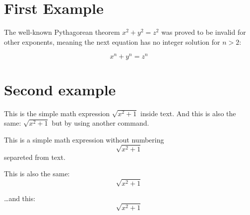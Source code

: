 \documentclass{article}
\begin{document}
\section{First Example}

The well-known Pythagorean theorem \(x^2 + y^2 = z^2\) was proved to be invalid  for 
other exponents, meaning the next equation has no integer solution for \(n>2\):

\[x^n + y^n = z^n\]

\section{Second example}

This is the simple math expression \(\sqrt{x^2+1}\) inside text.
And this is also the same:
\begin{math}
\sqrt{x^2+1}
\end{math}
but by using another command.

This is a simple math expression without numbering
\[\sqrt{x^2+1}\]
separeted from text.

This is also the same:
\begin{displaymath}
\sqrt{x^2+1}
\end{displaymath}

\ldots and this:
\begin{equation*}
\sqrt{x^2+1}
\end{equation*}
\end{document}

